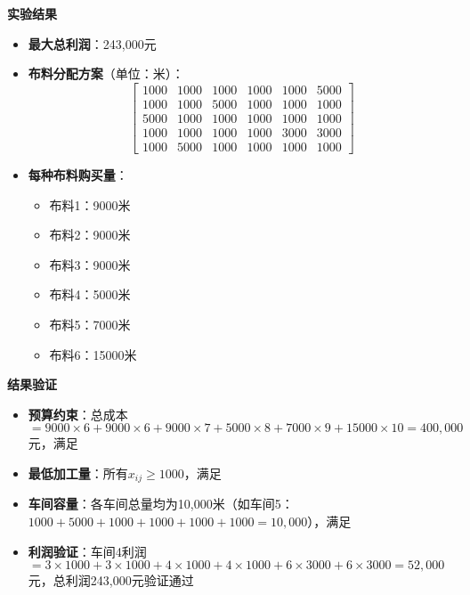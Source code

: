 \textbf{实验结果}
\begin{itemize}
    \item \textbf{最大总利润}：243,000元
    \item \textbf{布料分配方案}（单位：米）：
    \[
    \begin{bmatrix}
    1000 & 1000 & 1000 & 1000 & 1000 & 5000 \\
    1000 & 1000 & 5000 & 1000 & 1000 & 1000 \\
    5000 & 1000 & 1000 & 1000 & 1000 & 1000 \\
    1000 & 1000 & 1000 & 1000 & 3000 & 3000 \\
    1000 & 5000 & 1000 & 1000 & 1000 & 1000
    \end{bmatrix}
    \]
    \item \textbf{每种布料购买量}：
    \begin{itemize}
        \item 布料1：9000米
        \item 布料2：9000米
        \item 布料3：9000米
        \item 布料4：5000米
        \item 布料5：7000米
        \item 布料6：15000米
    \end{itemize}
\end{itemize}

\textbf{结果验证}
\begin{itemize}
    \item \textbf{预算约束}：总成本$=9000\times6+9000\times6+9000\times7+5000\times8+7000\times9+15000\times10=400,000$元，满足
    \item \textbf{最低加工量}：所有$x_{ij} \geq 1000$，满足
    \item \textbf{车间容量}：各车间总量均为10,000米（如车间5：$1000+5000+1000+1000+1000+1000=10,000$），满足
    \item \textbf{利润验证}：车间4利润$=3\times1000+3\times1000+4\times1000+4\times1000+6\times3000+6\times3000=52,000$元，总利润243,000元验证通过
\end{itemize}

